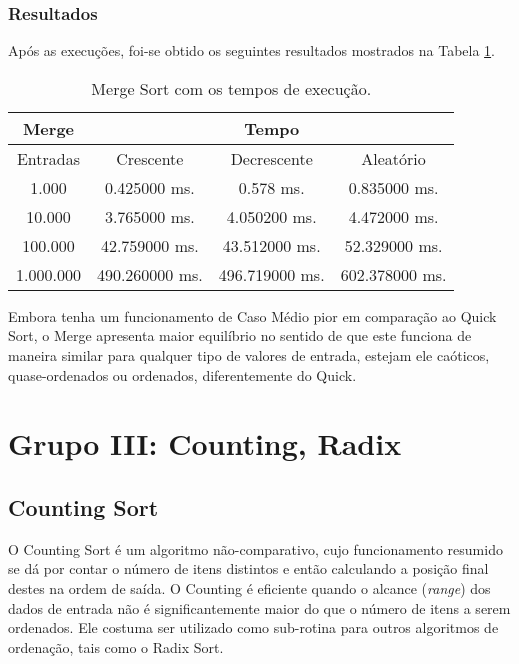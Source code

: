 \documentclass[
	12pt,				%
	openany,
	a4paper,			%
	english,			%
	french,				%
	spanish,			%
	brazil,				%
	]{abntex2}
\begin{document}
	\subsection{Resultados}
	   	Após as execuções, foi-se obtido os seguintes resultados mostrados na Tabela \ref{tab:merge}.
	   	
	  \begin{table}[H]
\centering
\begin{tabular}{|c|c|c|c|}
\hline
Merge & \multicolumn{3}{c|}{Tempo} \\ \hline
Entradas & Crescente & Decrescente & Aleatório \\ \hline
1.000 & 0.425000 ms. & 0.578 ms. & 0.835000 ms. \\ \hline
10.000 & 3.765000 ms. & 4.050200 ms. & 4.472000 ms. \\ \hline
100.000 & 42.759000 ms. & 43.512000 ms. & 52.329000 ms. \\ \hline
1.000.000 & 490.260000 ms. & 496.719000 ms. & 602.378000 ms. \\ \hline
\end{tabular}
\caption{Merge Sort com os tempos de execução.}
\label{tab:merge}
\end{table}

    
    Embora tenha um funcionamento de Caso Médio pior em comparação ao Quick Sort, o Merge apresenta maior equilíbrio no sentido de que este funciona de maneira similar para qualquer tipo de valores de entrada, estejam ele caóticos, quase-ordenados ou ordenados, diferentemente do Quick. 
    
\chapter{Grupo III: Counting, Radix}
    \section{Counting Sort}
	
	
	O Counting Sort é um algoritmo não-comparativo, cujo funcionamento resumido se dá por contar o número de itens distintos e então calculando a posição final destes na ordem de saída. O Counting é eficiente quando o alcance (\textit{range}) dos dados de entrada não é significantemente maior do que o número de itens a serem ordenados. Ele costuma ser utilizado como sub-rotina para outros algoritmos de ordenação, tais como o Radix Sort.
	
\end{document}
